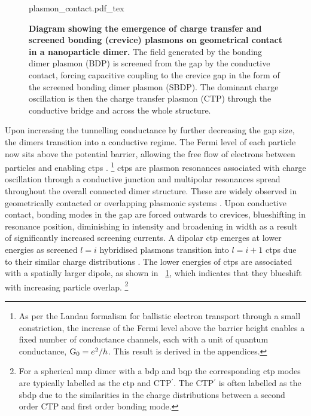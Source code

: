 \documentclass{article}
\begin{document}
\begin{figure}[bt]
\centering
\fontsize{10pt}{1em}\selectfont
\def\svgwidth{0.65\textwidth}
{plasmon_contact.pdf_tex}
\caption[Diagram showing the emergence of charge transfer and screened bonding (crevice) plasmons on geometrical contact in a nanoparticle dimer]{\textbf{Diagram showing the emergence of charge transfer and screened bonding (crevice) plasmons on geometrical contact in a nanoparticle dimer.} The field generated by the bonding dimer plasmon (BDP) is screened from the gap by the conductive contact, forcing capacitive coupling to the crevice gap in the form of the screened bonding dimer plasmon (SBDP). The dominant charge oscillation is then the charge transfer plasmon (CTP) through the conductive bridge and across the whole structure.}
\label{fig:plasmon_contact}
\end{figure}

Upon increasing the tunnelling conductance by further decreasing the gap size, the dimers transition into a conductive regime. The Fermi level of each particle now sits above the potential barrier, allowing the free flow of electrons between particles and enabling \glspl{ctp} \cite{zuloaga2009}.%
\footnote{As per the Landau formalism for ballistic electron transport through a small constriction, the increase of the Fermi level above the barrier height enables a fixed number of conductance channels, each with a unit of quantum conductance, $\mathrm{G_{0}} = e^2/h$. This result is derived in the appendices.}
\Glspl{ctp} are plasmon resonances associated with charge oscillation through a conductive junction and multipolar resonances spread throughout the overall connected dimer structure. These are widely observed in geometrically contacted or overlapping plasmonic systems \cite{atay2004, lassiter2008}. Upon conductive contact, bonding modes in the gap are forced outwards to crevices, blueshifting in resonance position, diminishing in intensity and broadening in width as a result of significantly increased screening currents. A dipolar \gls{ctp} emerges at lower energies as screened $l=i$ hybridised plasmons transition into $l=i+1$ \glspl{ctp} due to their similar charge distributions \cite{romero2006, perez2010, tserkezis2014}. The lower energies of \glspl{ctp} are associated with a spatially larger dipole, as shown in \figurename~\ref{fig:plasmon_contact}, which indicates that they blueshift with increasing particle overlap.%
\footnote{For a spherical \gls{mnp} dimer with a \gls{bdp} and \gls{bqp} the corresponding \gls{ctp} modes are typically labelled as the \gls{ctp} and CTP$^\prime$. The CTP$^\prime$ is often labelled as the \gls{sbdp} due to the similarities in the charge distributions between a second order CTP and first order bonding mode.}
\end{document}
